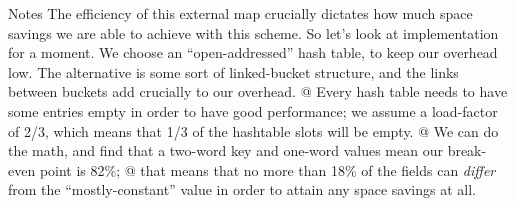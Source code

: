 \documentclass[%
pdf,
colorBG,
slideColor,
nototal,
oqe
]{prosper}
\newenvironment{talknotes}{\begin{slide}{Notes}\tiny}{\end{slide}}
\begin{document}

\begin{talknotes}
The efficiency of this external map crucially dictates how much space
savings we are able to achieve with this scheme.  So let's look at
implementation for a moment.  We choose an ``open-addressed'' hash
table, to keep our overhead low.  The alternative is some sort of
linked-bucket structure, and the links between buckets add crucially
to our overhead. @ Every hash table needs to have some entries empty
in order to have good performance; we assume a load-factor of 2/3,
which means that 1/3 of the hashtable slots will be empty.  @
We can do the math, and find that a two-word key and one-word values
mean our break-even point is 82\%; @ that means that no more than 18\%
of the fields can \emph{differ} from the ``mostly-constant'' value in
order to attain any space savings at all.
\end{talknotes}
\end{document}
